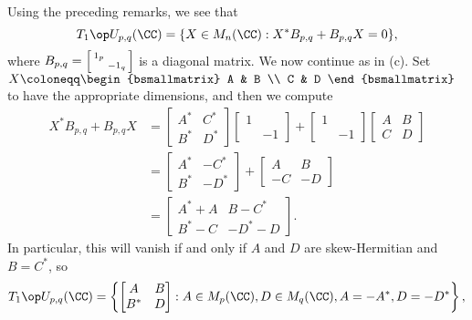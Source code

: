 \documentclass[../notes.tex]{subfiles}
\begin{document}
\begin{listalph}
	\item Using the preceding remarks, we see that
	\[T_1\op U_{p,q}(\CC)=\{X\in M_n(\CC):X^*B_{p,q}+B_{p,q}X=0\},\]
	where $B_{p,q}=\begin{bsmallmatrix}
		1_p \\ & -1_q
	\end{bsmallmatrix}$ is a diagonal matrix. We now continue as in (c). Set $X\coloneqq\begin{bsmallmatrix}
		A & B \\ C & D
	\end{bsmallmatrix}$ to have the appropriate dimensions, and then we compute
	\begin{align*}
		X^*B_{p,q}+B_{p,q}X &= \begin{bmatrix}
			A^* & C^* \\ B^* & D^*
		\end{bmatrix}\begin{bmatrix}
			1 \\ & -1
		\end{bmatrix}+\begin{bmatrix}
			1 \\ & -1
		\end{bmatrix}\begin{bmatrix}
			A & B \\ C & D
		\end{bmatrix} \\
		&= \begin{bmatrix}
			A^* & -C^* \\ B^* & -D^*
		\end{bmatrix}+\begin{bmatrix}
			A & B \\ -C & -D
		\end{bmatrix} \\
		&= \begin{bmatrix}
			A^*+A & B-C^* \\ B^*-C & -D^*-D
		\end{bmatrix}.
	\end{align*}
	In particular, this will vanish if and only if $A$ and $D$ are skew-Hermitian and $B=C^*$, so
	\begin{align*}
		T_1\op U_{p,q}(\CC) &= \left\{\begin{bmatrix}
			A & B \\ B^* & D
		\end{bmatrix}:A\in M_p(\CC),D\in M_q(\CC),A=-A^*,D=-D^*\right\}, \\

\end{align*}
\end{listalph}
\end{document}
